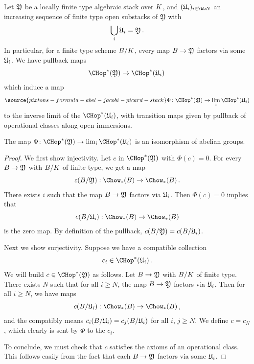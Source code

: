 Let $\frak Y$ be a locally finite type algebraic stack over ${K}$, and $(\frak U_i)_{i \in \bb N}$ an increasing sequence of finite type open substacks of $\mathfrak Y$ with
$$\bigcup_i \frak U_i =  \frak Y\, .$$
In particular, for a finite type scheme $B/{K}$, every
map $B \to \frak Y$ factors via some $\frak U_i$. We have pullback maps
\begin{equation}
\CHop^*(\frak Y) \to \CHop^*(\frak U_i)\,
\end{equation}
which induce a map
\begin{equation}\label{eq:chop_lim}
\source{pixtons-formula-abel-jacobi-picard-stack}
\Phi\colon \CHop^*(\frak Y) \to \lim_i \CHop^*(\frak U_i)
\end{equation}
to the inverse limit of the $\CHop^*(\frak U_i)$, with transition maps given by pullback of operational classes along open immersions.

\begin{lemma}
\notready\label{lem:chop_and_limits}
The map $\Phi\colon \CHop^*(\frak Y) \to \lim_i \CHop^*(\frak U_i)$ is an isomorphism of abelian groups.
\end{lemma}
\begin{proof}
We first show injectivity. Let $c$ in $\CHop^*(\frak Y)$ with $\Phi(c) = 0$. For every $B \to \frak Y$ with $B/{K}$ of
finite type, we get a map $$c(B/\frak Y):\Chow_*(B) \to \Chow_*(B)\, . $$
There exists $i$ such that the map $B \to \frak Y$ factors via $\frak U_i$. Then $\Phi(c) = 0$ implies that
$$c(B/\frak U_i):\Chow_*(B) \to \Chow_*(B)$$ is the zero map. By definition of the pullback, $c(B/\frak Y) = c(B/\frak U_i)$.

Next we show surjectivity. Suppose we have a compatible collection
$$c_i \in \CHop^*(\frak U_i)\, .$$
We will build $c \in \CHop^*(\frak Y)$ as follows.
Let $B \to  \frak Y$ with $B/{K}$ of finite type. There exists $N$ such that for all $i\ge N$,
the map $B \to \frak Y$ factors via $\frak U_i$. Then for all $i \ge N$,
we have maps $$c(B/\frak U_i):\Chow_*(B) \to \Chow_*(B)\, ,$$
and the compatibly means $c_i(B/\frak U_i) = c_j(B/\frak U_i)$ for all $i$, $j \ge N$.
We define $c = c_N$, which clearly is sent by $\Phi$ to
the $c_i$.

To conclude, we must check that $c$ satisfies the axioms of an operational class. This follows easily from the fact that each $B \to \frak Y$ factors via some $\frak U_i$.
\end{proof}


